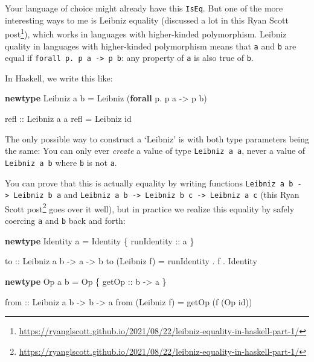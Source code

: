 \documentclass[]{article}
\newenvironment{Shaded}{}{}
\newcommand{\DataTypeTok}[1]{\textcolor[rgb]{0.56,0.13,0.00}{#1}}
\newcommand{\FunctionTok}[1]{\textcolor[rgb]{0.02,0.16,0.49}{#1}}
\newcommand{\KeywordTok}[1]{\textcolor[rgb]{0.00,0.44,0.13}{\textbf{#1}}}
\newcommand{\NormalTok}[1]{#1}
\newcommand{\OperatorTok}[1]{\textcolor[rgb]{0.40,0.40,0.40}{#1}}
\newcommand{\OtherTok}[1]{\textcolor[rgb]{0.00,0.44,0.13}{#1}}
\renewcommand{\href}[2]{#2\footnote{\url{#1}}}
\begin{document}
Your language of choice might already have this \texttt{IsEq}. But one of the
more interesting ways to me is Leibniz equality (discussed a lot in
\href{https://ryanglscott.github.io/2021/08/22/leibniz-equality-in-haskell-part-1/}{this
Ryan Scott post}), which works in languages with higher-kinded polymorphism.
Leibniz quality in languages with higher-kinded polymorphism means that
\texttt{a} and \texttt{b} are equal if
\texttt{forall\ p.\ p\ a\ -\textgreater{}\ p\ b}: any property of \texttt{a} is
also true of \texttt{b}.

In Haskell, we write this like:

\begin{Shaded}
\begin{Highlighting}[]
\KeywordTok{newtype} \DataTypeTok{Leibniz}\NormalTok{ a b }\OtherTok{=} \DataTypeTok{Leibniz}\NormalTok{ (}\KeywordTok{forall}\NormalTok{ p}\OperatorTok{.}\NormalTok{ p a }\OtherTok{{-}\textgreater{}}\NormalTok{ p b)}

\OtherTok{refl ::} \DataTypeTok{Leibniz}\NormalTok{ a a}
\NormalTok{refl }\OtherTok{=} \DataTypeTok{Leibniz} \FunctionTok{id}
\end{Highlighting}
\end{Shaded}

The only possible way to construct a `Leibniz' is with both type parameters
being the same: You can only ever \emph{create} a value of type
\texttt{Leibniz\ a\ a}, never a value of \texttt{Leibniz\ a\ b} where \texttt{b}
is not \texttt{a}.

You can prove that this is actually equality by writing functions
\texttt{Leibniz\ a\ b\ -\textgreater{}\ Leibniz\ b\ a} and
\texttt{Leibniz\ a\ b\ -\textgreater{}\ Leibniz\ b\ c\ -\textgreater{}\ Leibniz\ a\ c}
(\href{https://ryanglscott.github.io/2021/08/22/leibniz-equality-in-haskell-part-1/}{this
Ryan Scott post} goes over it well), but in practice we realize this equality by
safely coercing \texttt{a} and \texttt{b} back and forth:

\begin{Shaded}
\begin{Highlighting}[]
\KeywordTok{newtype} \DataTypeTok{Identity}\NormalTok{ a }\OtherTok{=} \DataTypeTok{Identity}\NormalTok{ \{}\OtherTok{ runIdentity ::}\NormalTok{ a \}}

\OtherTok{to ::} \DataTypeTok{Leibniz}\NormalTok{ a b }\OtherTok{{-}\textgreater{}}\NormalTok{ a }\OtherTok{{-}\textgreater{}}\NormalTok{ b}
\NormalTok{to (}\DataTypeTok{Leibniz}\NormalTok{ f) }\OtherTok{=}\NormalTok{ runIdentity }\OperatorTok{.}\NormalTok{ f }\OperatorTok{.} \DataTypeTok{Identity}

\KeywordTok{newtype} \DataTypeTok{Op}\NormalTok{ a b }\OtherTok{=} \DataTypeTok{Op}\NormalTok{ \{}\OtherTok{ getOp ::}\NormalTok{ b }\OtherTok{{-}\textgreater{}}\NormalTok{ a \}}

\OtherTok{from ::} \DataTypeTok{Leibniz}\NormalTok{ a b }\OtherTok{{-}\textgreater{}}\NormalTok{ b }\OtherTok{{-}\textgreater{}}\NormalTok{ a}
\NormalTok{from (}\DataTypeTok{Leibniz}\NormalTok{ f) }\OtherTok{=}\NormalTok{ getOp (f (}\DataTypeTok{Op} \FunctionTok{id}\NormalTok{))}
\end{Highlighting}
\end{Shaded}
\end{document}
